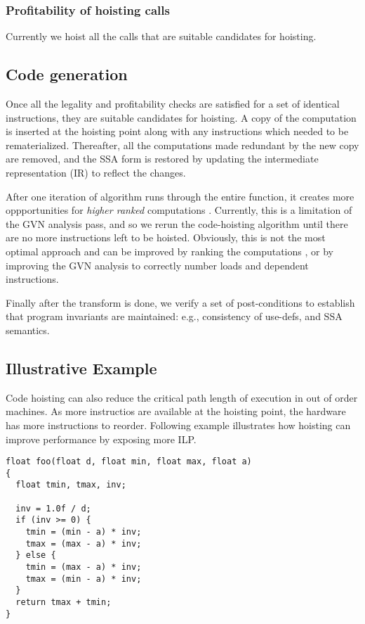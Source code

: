 \documentclass{sig-alternate}
\begin{document}
\subsubsection{Profitability of hoisting calls}
Currently we hoist all the calls that are suitable candidates for hoisting.

\subsection{Code generation}
Once all the legality and profitability checks are satisfied for a set of
identical instructions, they are suitable candidates for hoisting. A copy of the
computation is inserted at the hoisting point along with any instructions which
needed to be rematerialized. Thereafter, all the computations made redundant by
the new copy are removed, and the SSA form is restored by updating the
intermediate representation (IR) to reflect the changes.

After one iteration of algorithm runs through the entire function, it creates
more oppportunities for \emph{higher ranked} computations
\cite{rosen1988global}. Currently, this is a limitation of the GVN analysis
pass, and so we rerun the code-hoisting algorithm until there are no more
instructions left to be hoisted.  Obviously, this is not the most optimal
approach and can be improved by ranking the computations \cite{rosen1988global},
or by improving the GVN analysis to correctly number loads and dependent
instructions.

Finally after the transform is done, we verify a set of post-conditions to
establish that program invariants are maintained: e.g., consistency of
use-defs, and SSA semantics.

\newpage

\subsection{Illustrative Example}
Code hoisting can also reduce the critical path length of execution in out of
order machines. As more instructios are available at the hoisting point, the
hardware has more instructions to reorder. Following example illustrates how
hoisting can improve performance by exposing more ILP.

\begin{verbatim}
float foo(float d, float min, float max, float a)
{
  float tmin, tmax, inv;

  inv = 1.0f / d;
  if (inv >= 0) {
    tmin = (min - a) * inv;
    tmax = (max - a) * inv;
  } else {
    tmin = (max - a) * inv;
    tmax = (min - a) * inv;
  }
  return tmax + tmin;
}
\end{verbatim}
\end{document}
